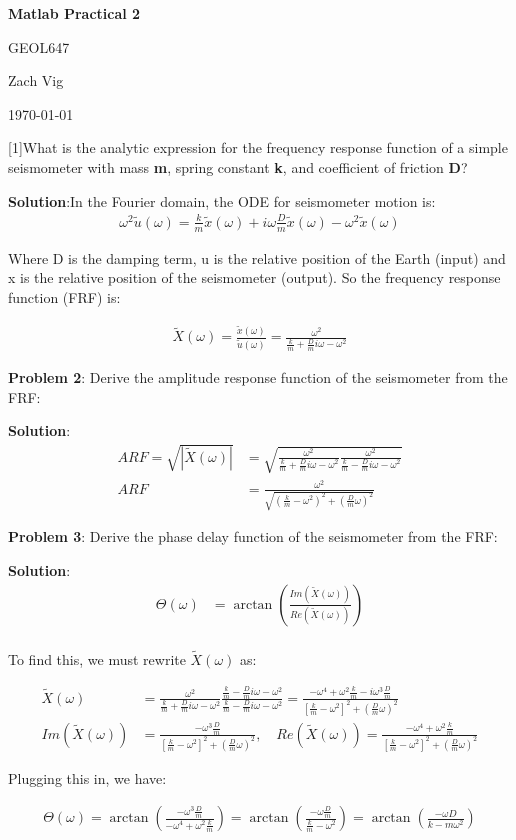\documentclass{article} %
\newcommand{\question}[2][]{\begin{flushleft}
        \textbf{Problem #1}: #2
\end{flushleft}}
\newcommand{\sol}{\textbf{Solution}:} %
\newcommand{\maketitletwo}[2][]{
        \begin{center}
        \Large{\textbf{Matlab Practical 2}
            
            GEOL647} %
        \vspace{5pt}
        
        \normalsize{Zach Vig  %
        
        \today}        %
        \vspace{15pt}
        
        \end{center}}
\begin{document}
\maketitletwo[2]

\question[1]{What is the analytic expression for the frequency response function of a simple seismometer with mass \textbf{m}, spring constant \textbf{k}, and coefficient of friction \textbf{D}?}

\sol In the Fourier domain, the ODE for seismometer motion is:
\begin{align*}
\omega^2\tilde{u}(\omega) = \frac{k}{m}\tilde{x}(\omega)+i\omega\frac{D}{m}\tilde{x}(\omega)-\omega^2\tilde{x}(\omega)
\end{align*}

Where D is the damping term, u is the relative position of the Earth (input) and x is the relative position of the seismometer (output). So the frequency response function (FRF) is:

\begin{align*}
        \tilde{X}(\omega)= \frac{\tilde{x}(\omega)}{\tilde{u}(\omega)} = \frac{\omega^2}{\frac{k}{m}+\frac{D}{m}i\omega-\omega^2}
\end{align*}

\question[2]{Derive the amplitude response function of the seismometer from the FRF:}

\sol
\begin{align*}
        ARF = \sqrt{|\tilde{X}(\omega)|} &= \sqrt{\frac{\omega^2}{\frac{k}{m}+\frac{D}{m}i\omega-\omega^2}\frac{\omega^2}{\frac{k}{m}-\frac{D}{m}i\omega-\omega^2}} \\
        ARF &= \frac{\omega^2}{\sqrt{\left(\frac{k}{m}-\omega^2\right)^2+\left(\frac{D}{m}\omega\right)^2}}
\end{align*}

\question[3]{Derive the phase delay function of the seismometer from the FRF:}

\sol
\begin{align*}
        \Theta (\omega) &= \arctan\left(\frac{Im(\tilde{X}(\omega))}{Re(\tilde{X}(\omega))}\right) \\
\end{align*}

To find this, we must rewrite $\tilde{X}(\omega)$ as:

\begin{align*}
        \tilde{X}(\omega) &= \frac{\omega^2}{\frac{k}{m}+\frac{D}{m}i\omega-\omega^2}\frac{\frac{k}{m}-\frac{D}{m}i\omega-\omega^2}{\frac{k}{m}-\frac{D}{m}i\omega-\omega^2} = \frac{-\omega^4+\omega^2\frac{k}{m}-i\omega^3\frac{D}{m}}{\left[\frac{k}{m}-\omega^2\right]^2+\left(\frac{D}{m}\omega\right)^2} \\ 
        Im(\tilde{X}(\omega)) &= \frac{-\omega^3\frac{D}{m}}{\left[\frac{k}{m}-\omega^2\right]^2+\left(\frac{D}{m}\omega\right)^2}, \quad Re(\tilde{X}(\omega)) = \frac{-\omega^4 + \omega^2\frac{k}{m}}{\left[\frac{k}{m}-\omega^2\right]^2+\left(\frac{D}{m}\omega\right)^2}
\end{align*}

Plugging this in, we have:

\begin{align*}
        \Theta(\omega) = \arctan\left(\frac{-\omega^3\frac{D}{m}}{-\omega^4+\omega^2\frac{k}{m}}\right) = \arctan\left(\frac{-\omega\frac{D}{m}}{\frac{k}{m}-\omega^2}\right) = \arctan\left(\frac{-\omega D}{k-m\omega^2}\right)
\end{align*}
\end{document}
